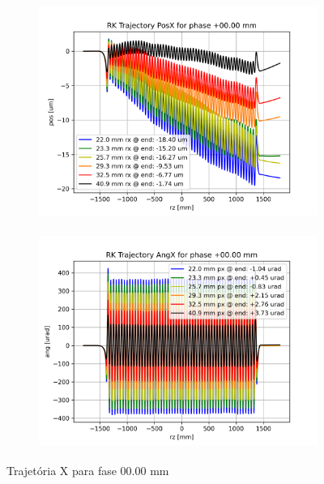 \documentclass[a4paper,12pt]{article}
\begin{document}
\begin{figure}[H]
\begin{subfigure}{0.5\textwidth}
\includegraphics[width=0.9\linewidth, height=7cm]{figs/phase0 RK Posx.png} 
\label{fig:subim10tx}
\end{subfigure}
\begin{subfigure}{0.5\textwidth}
\includegraphics[width=0.9\linewidth, height=7cm]{figs/phase0 RK Angx.png}
\label{fig:subim20tx}
\end{subfigure}
\caption{Trajetória X para fase 00.00 mm}
\label{fig:trajx0}
\end{figure}
\end{document}
